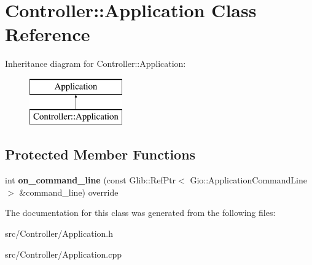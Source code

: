 \hypertarget{classController_1_1Application}{}\section{Controller\+::Application Class Reference}
\label{classController_1_1Application}
Inheritance diagram for Controller\+::Application\+:\begin{figure}[H]
\begin{center}
\leavevmode
\includegraphics[height=2.000000cm]{classController_1_1Application}
\end{center}
\end{figure}
\subsection*{Protected Member Functions}
\begin{DoxyCompactItemize}
\item 
\mbox{\label{classController_1_1Application_aa249e6a201a8e02879e60d56bd657fc3}} 
int {\bfseries on\+\_\+command\+\_\+line} (const Glib\+::\+Ref\+Ptr$<$ Gio\+::\+Application\+Command\+Line $>$ \&command\+\_\+line) override
\end{DoxyCompactItemize}


The documentation for this class was generated from the following files\+:\begin{DoxyCompactItemize}
\item 
src/\+Controller/Application.\+h\item 
src/\+Controller/Application.\+cpp\end{DoxyCompactItemize}
